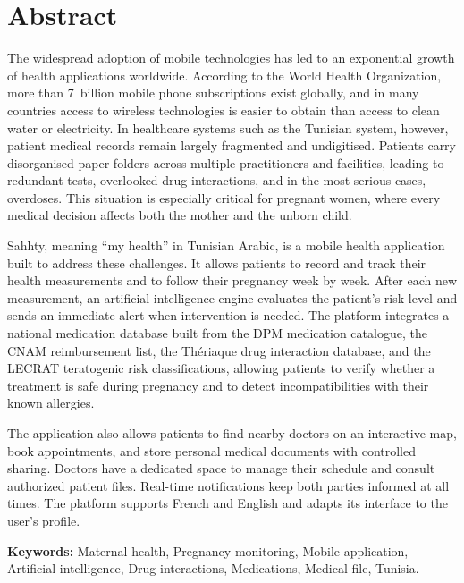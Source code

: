 \chapter*{Abstract}

The widespread adoption of mobile technologies has led to an exponential growth of
health applications worldwide. According to the World Health Organization, more than
7~billion mobile phone subscriptions exist globally, and in many countries access to
wireless technologies is easier to obtain than access to clean water or electricity.
In healthcare systems such as the Tunisian system, however, patient medical records
remain largely fragmented and undigitised. Patients carry disorganised paper folders
across multiple practitioners and facilities, leading to redundant tests, overlooked drug
interactions, and in the most serious cases, overdoses. This situation is especially
critical for pregnant women, where every medical decision affects both the mother and
the unborn child.

Sahhty, meaning ``my health'' in Tunisian Arabic, is a mobile health application built to
address these challenges. It allows patients to record and track their health measurements
and to follow their pregnancy week by week. After each new measurement, an artificial
intelligence engine evaluates the patient's risk level and sends an immediate alert when
intervention is needed. The platform integrates a national medication database built from
the DPM medication catalogue, the CNAM reimbursement list, the Thériaque drug
interaction database, and the LECRAT teratogenic risk classifications, allowing patients
to verify whether a treatment is safe during pregnancy and to detect incompatibilities
with their known allergies.

The application also allows patients to find nearby doctors on an interactive map, book
appointments, and store personal medical documents with controlled sharing. Doctors
have a dedicated space to manage their schedule and consult authorized patient files.
Real-time notifications keep both parties informed at all times. The platform supports
French and English and adapts its interface to the user's profile.

\bigskip
\noindent\textbf{Keywords:} Maternal health, Pregnancy monitoring, Mobile application,
Artificial intelligence, Drug interactions, Medications, Medical file, Tunisia.

